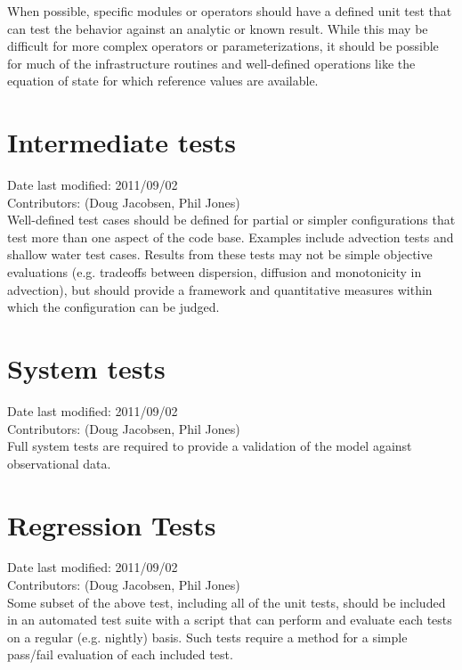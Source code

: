 \documentclass[11pt]{report}
\begin{document}
When possible, specific modules or operators should have a defined unit 
test that can test the behavior against an analytic or known result.  While 
this may be difficult for more complex operators or parameterizations, it 
should be possible for much of the infrastructure routines and well-defined 
operations like the equation of state for which reference values are available.

\section{Intermediate tests}
Date last modified: 2011/09/02 \\
Contributors: (Doug Jacobsen, Phil Jones) \\

Well-defined test cases should be defined for partial or simpler configurations 
that test more than one aspect of the code base.  Examples include advection 
tests and shallow water test cases.  Results from these tests may not be 
simple objective evaluations (e.g. tradeoffs between dispersion, diffusion 
and monotonicity in advection), but should provide a framework and quantitative
measures within which the configuration can be judged.

\section{System tests}
Date last modified: 2011/09/02 \\
Contributors: (Doug Jacobsen, Phil Jones) \\

Full system tests are required to provide a validation of the model 
against observational data.

\section{Regression Tests}
Date last modified: 2011/09/02 \\
Contributors: (Doug Jacobsen, Phil Jones) \\

Some subset of the above test, including all of the unit tests, should be 
included in an automated test suite with a script that can perform and 
evaluate each tests on a regular (e.g. nightly) basis.  Such tests require 
a method for a simple pass/fail evaluation of each included test.

\end{document}
